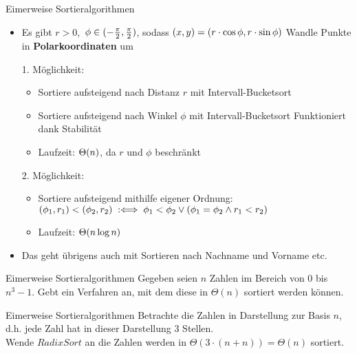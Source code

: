 \begin{frame}{Eimerweise Sortieralgorithmen}
	\solutionheading
	\begin{itemize}
		\item Es gibt $r > 0$,\, $\phi \in (-\fract \pi/2 , \fract \pi/2 )$, \; sodass \;  $(x, y) = (r \cdot \cos \phi, r \cdot \sin \phi)$
		\implitem Wandle Punkte in \textbf{Polarkoordinaten} um
		\pause
		\item[1.] Möglichkeit:
		\begin{itemize}
			\item Sortiere aufsteigend nach Distanz $r$ mit Intervall-Bucketsort
			\item Sortiere aufsteigend nach Winkel $\phi$ mit Intervall-Bucketsort %
			\implitem Funktioniert dank Stabilität
			\item Laufzeit: $\Theta\!\left(n\right)$, da $r$ und $\phi$ beschränkt
		\end{itemize}
		\pause
		\item[2.] Möglichkeit:
		\begin{itemize}
			\item Sortiere aufsteigend mithilfe eigener Ordnung: \\
			$(\phi_1, r_1) < (\phi_2, r_2) \Gdwdef \phi_1 < \phi_2 \lor (\phi_1 = \phi_2 \land r_1 < r_2)$
			\item Laufzeit: $\Theta\!\left(n \log n\right)$
		\end{itemize}
		\medskip
		\item Das geht übrigens auch mit Sortieren nach Nachname und Vorname etc. 
	\end{itemize}
\end{frame}

\begin{frame}{Eimerweise Sortieralgorithmen}
	Gegeben seien $n$ Zahlen im Bereich von $0$ bis $n^3 - 1$. Gebt ein Verfahren an, mit dem diese in $\Theta(n)$ sortiert werden können.
\end{frame}

\begin{frame}{Eimerweise Sortieralgorithmen}
	\solutionheading
	Betrachte die Zahlen in Darstellung zur Basis $n$, d.h. jede Zahl hat in dieser Darstellung 3 Stellen. \\ 
	Wende $RadixSort$ an \impl die Zahlen werden in $\Theta(3 \cdot (n + n)) = \Theta(n)$ sortiert.
\end{frame}

